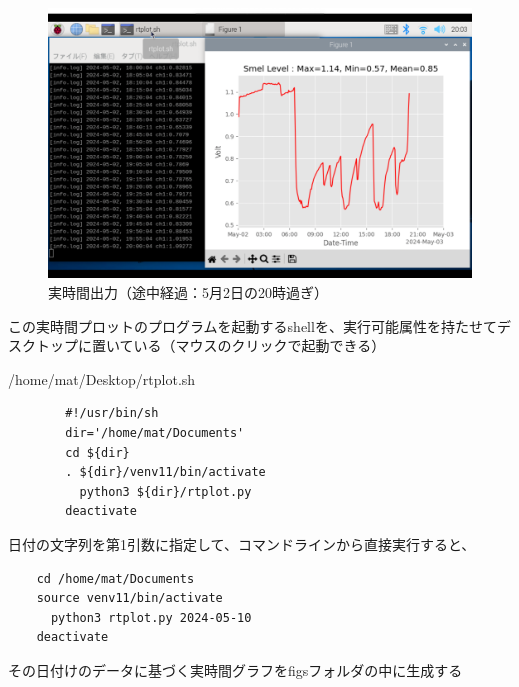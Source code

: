 \documentclass[12pt,a4paper,uplatex]{jsbook}
\begin{document}
\begin{figure}[htbp]
	\begin{minipage}[b]{1.0\linewidth}
		\centering
		\includegraphics[keepaspectratio, scale=0.26]{figs/png/screen2.png}
		\caption{実時間出力（途中経過：5月2日の20時過ぎ）}
	\end{minipage}
\end{figure}

この実時間プロットのプログラムを起動するshellを、実行可能属性を持たせてデスクトップに置いている（マウスのクリックで起動できる）

\begin{itembox}[l]{/home/mat/Desktop/rtplot.sh}
	\begin{verbatim}
		#!/usr/bin/sh
		dir='/home/mat/Documents'
		cd ${dir}
		. ${dir}/venv11/bin/activate
		  python3 ${dir}/rtplot.py
		deactivate
	\end{verbatim}
\end{itembox}

日付の文字列を第1引数に指定して、コマンドラインから直接実行すると、
\begin{verbatim}
	cd /home/mat/Documents
	source venv11/bin/activate
	  python3 rtplot.py 2024-05-10
	deactivate
\end{verbatim}
その日付けのデータに基づく実時間グラフをfigsフォルダの中に生成する

\end{document}
